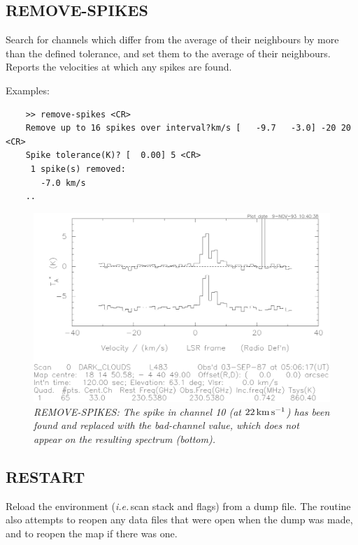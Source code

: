 \documentclass[11pt,twoside]{report}
\newcommand{\ie}{{\it i.e.\,}}
\newcommand{\kms}{{\rm\,km\,s^{-1}}}
\begin{document}
\subsection{REMOVE-SPIKES} 

Search for channels which differ from the average of their neighbours by
more than the defined tolerance, and set them to the average of their
neighbours. Reports the velocities at which any spikes are found.

Examples:
\begin{verbatim}
    >> remove-spikes <CR>
    Remove up to 16 spikes over interval?km/s [   -9.7   -3.0] -20 20 <CR>
    Spike tolerance(K)? [  0.00] 5 <CR>
     1 spike(s) removed:
       -7.0 km/s
    ..
\end{verbatim}

\begin{figure}[htbp]
\begin{center}
\includegraphics[scale=0.65]{rem-spikes.ps}
\protect\parbox{5.5in}
{\caption[SPIKES]
{\sl
REMOVE-SPIKES: The spike in channel 10 (at $22\kms$) has been found and
replaced with the bad-channel value, which does not appear on the
resulting spectrum (bottom).
\label{SPIKES}
}
}
\end{center}
\end{figure}

\subsection{RESTART} 

Reload the environment  (\ie scan stack
and flags) from a dump file. The routine also attempts to reopen any data files
that were open when the dump was made, and to reopen the map if there was one.
\end{document}
